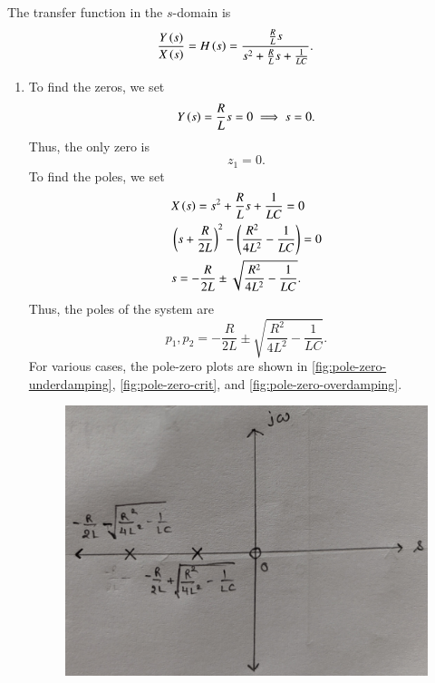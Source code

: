 \documentclass[journal,12pt,twocolumn]{IEEEtran}
\begin{document}
The transfer function in the \(s\)-domain is
\begin{align}
    \frac{Y\left(s\right)}{X\left(s\right)} = H\left(s\right) = \frac{\frac{R}{L}s}{s^2 + \frac{R}{L}s + \frac{1}{LC}}.
    \label{eq:s-trans-func}
\end{align}

\begin{enumerate}[label=\theenumi.]
    \item To find the zeros, we set
    \begin{equation}
        Y\left(s\right) = \frac{R}{L}s = 0 \implies s = 0.
    \end{equation}
    Thus, the only zero is
    \begin{equation}
        z_1 = 0. \label{eq:zeros}
    \end{equation}
    To find the poles, we set
    \begin{align}
        &X\left(s\right) = s^2 + \frac{R}{L}s + \frac{1}{LC} = 0 \\
        &\left(s + \frac{R}{2L}\right)^2 - \left(\frac{R^2}{4L^2} - \frac{1}{LC}\right) = 0 \\
        &s = -\frac{R}{2L} \pm \sqrt{\frac{R^2}{4L^2} - \frac{1}{LC}}.
    \end{align}
    Thus, the poles of the system are 
    \begin{equation}
        p_1, p_2 = -\frac{R}{2L} \pm \sqrt{\frac{R^2}{4L^2} - \frac{1}{LC}}.
        \label{eq:poles}
    \end{equation}
    For various cases, the pole-zero plots are shown in 
    \autoref{fig:pole-zero-underdamping}, \autoref{fig:pole-zero-crit}, and
    \autoref{fig:pole-zero-overdamping}.
    \begin{figure}[!ht]
        \centering
        \includegraphics[width=\columnwidth]{figs/pole-zero-overdamping.jpg}

\end{figure}
\end{enumerate}
\end{document}
